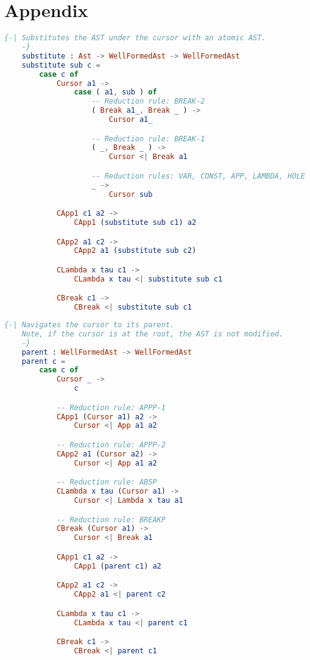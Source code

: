 \section{Appendix}

\begin{lstlisting}[language=elm,%
                   label=substitutefunction,%
                   caption="The Ast.substitute function.",%
                   gobble=4,%
                   ]
    {-| Substitutes the AST under the cursor with an atomic AST.
    -}
    substitute : Ast -> WellFormedAst -> WellFormedAst
    substitute sub c =
        case c of
            Cursor a1 ->
                case ( a1, sub ) of
                    -- Reduction rule: BREAK-2
                    ( Break a1_, Break _ ) ->
                        Cursor a1_

                    -- Reduction rule: BREAK-1
                    ( _, Break _ ) ->
                        Cursor <| Break a1

                    -- Reduction rules: VAR, CONST, APP, LAMBDA, HOLE
                    _ ->
                        Cursor sub

            CApp1 c1 a2 ->
                CApp1 (substitute sub c1) a2

            CApp2 a1 c2 ->
                CApp2 a1 (substitute sub c2)

            CLambda x tau c1 ->
                CLambda x tau <| substitute sub c1

            CBreak c1 ->
                CBreak <| substitute sub c1
\end{lstlisting}

\begin{lstlisting}[language=elm,%
                   label=parent-function,%
                   caption="The Ast.parent function.",%
                   gobble=4,%
                   ]
    {-| Navigates the cursor to its parent.
    Note, if the cursor is at the root, the AST is not modified.
    -}
    parent : WellFormedAst -> WellFormedAst
    parent c =
        case c of
            Cursor _ ->
                c

            -- Reduction rule: APPP-1
            CApp1 (Cursor a1) a2 ->
                Cursor <| App a1 a2

            -- Reduction rule: APPP-2
            CApp2 a1 (Cursor a2) ->
                Cursor <| App a1 a2

            -- Reduction rule: ABSP
            CLambda x tau (Cursor a1) ->
                Cursor <| Lambda x tau a1

            -- Reduction rule: BREAKP
            CBreak (Cursor a1) ->
                Cursor <| Break a1

            CApp1 c1 a2 ->
                CApp1 (parent c1) a2

            CApp2 a1 c2 ->
                CApp2 a1 <| parent c2

            CLambda x tau c1 ->
                CLambda x tau <| parent c1

            CBreak c1 ->
                CBreak <| parent c1
\end{lstlisting}

